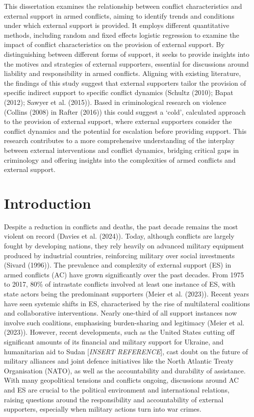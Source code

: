 \documentclass[
]{article}
\begin{document}
This dissertation examines the relationship between conflict
characteristics and external support in armed conflicts, aiming to
identify trends and conditions under which external support is provided.
It employs different quantitative methods, including random and fixed
effects logistic regression to examine the impact of conflict
characteristics on the provision of external support. By distinguishing
between different forms of support, it seeks to provide insights into
the motives and strategies of external supporters, essential for
discussions around liability and responsibility in armed conflicts.
Aligning with existing literature, the findings of this study suggest
that external supporters tailor the provision of specific indirect
support to specific conflict dynamics (Schultz (2010); Bapat (2012);
Sawyer et al. (2015)). Based in criminological research on violence
(Collins (2008) in Rafter (2016)) this could suggest a `cold',
calculated approach to the provision of external support, where external
supporters consider the conflict dynamics and the potential for
escalation before providing support. This research contributes to a more
comprehensive understanding of the interplay between external
interventions and conflict dynamics, bridging critical gaps in
criminology and offering insights into the complexities of armed
conflicts and external support.

\newpage

\section{Introduction}\label{introduction}

Despite a reduction in conflicts and deaths, the past decade remains the
most violent on record (Davies et al. (2024)). Today, although conflicts
are largely fought by developing nations, they rely heavily on advanced
military equipment produced by industrial countries, reinforcing
military over social investments (Sivard (1996)). The prevalence and
complexity of external support (ES) in armed conflicts (AC) have grown
significantly over the past decades. From 1975 to 2017, 80\% of
intrastate conflicts involved at least one instance of ES, with state
actors being the predominant supporters (Meier et al. (2023)). Recent
years have seen systemic shifts in ES, characterised by the rise of
multilateral coalitions and collaborative interventions. Nearly
one-third of all support instances now involve such coalitions,
emphasising burden-sharing and legitimacy (Meier et al. (2023)).
However, recent developments, such as the United States cutting off
significant amounts of its financial and military support for Ukraine,
and humanitarian aid to Sudan {[}\emph{INSERT REFERENCE}{]}, cast doubt
on the future of military alliances and joint defence initiatives like
the North Atlantic Treaty Organisation (NATO), as well as the
accountability and durability of assistance. With many geopolitical
tensions and conflicts ongoing, discussions around AC and ES are crucial
to the political environment and international relations, raising
questions around the responsibility and accountability of external
supporters, especially when military actions turn into war crimes.
\end{document}

